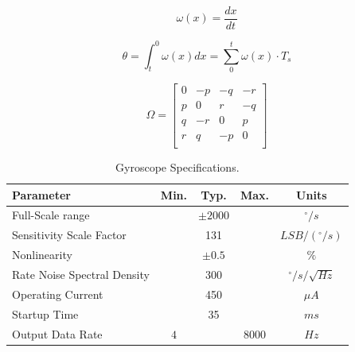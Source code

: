 \begin{equation}
    \omega(x) = \frac{dx}{dt}
\end{equation}

\begin{equation}
    \theta = \int_{t}^{0} \omega(x) dx = \sum_{0}^{t} \omega(x)\cdot T_s
\end{equation}

\begin{equation}
    \Omega = \begin{bmatrix}
        0 & -p & -q & -r \\
        p & 0  & r  & -q \\
        q & -r & 0  & p  \\
        r & q  & -p & 0  \\
    \end{bmatrix}
\end{equation}

\begin{table}[H]
    \begin{center}
        \begin{tabular}[t]{lcccc}
            \hline
            Parameter                   & Min. & Typ.       & Max.   & Units                  \\
            \hline
            Full-Scale range            &      & $\pm 2000$ &        & $^{\circ}/s$           \\
            Sensitivity Scale Factor    &      & 131        &        & $LSB/(^{\circ}/s)$     \\
            Nonlinearity                &      & $\pm 0.5$  &        & $\%$                   \\
            Rate Noise Spectral Density &      & 300        &        & $^{\circ}/s/\sqrt{Hz}$ \\
            Operating Current           &      & 450        &        & $\mu A$                \\
            Startup Time                &      & 35         &        & $ms$                   \\
            Output Data Rate            & $4$  &            & $8000$ & $Hz$                   \\
            \hline
        \end{tabular}
        \caption{Gyroscope Specifications. }
        \label{tab:gyroscope_specification}
    \end{center}
\end{table}

